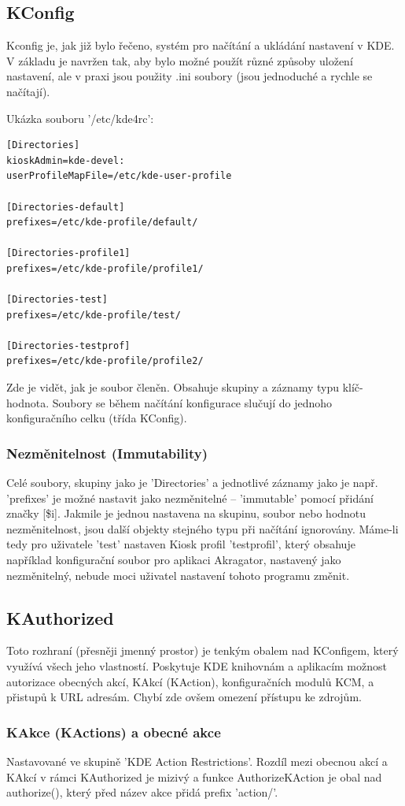 \subsection{KConfig}
Kconfig je, jak již bylo řečeno, systém pro načítání a ukládání nastavení v KDE.
V základu je navržen tak, aby bylo možné použít různé způsoby uložení nastavení,
ale v praxi jsou použity .ini soubory (jsou jednoduché a rychle se načítají).

Ukázka souboru '/etc/kde4rc':
\begin{verbatim}
[Directories]
kioskAdmin=kde-devel:
userProfileMapFile=/etc/kde-user-profile

[Directories-default]
prefixes=/etc/kde-profile/default/

[Directories-profile1]
prefixes=/etc/kde-profile/profile1/

[Directories-test]
prefixes=/etc/kde-profile/test/

[Directories-testprof]
prefixes=/etc/kde-profile/profile2/
\end{verbatim}
Zde je vidět, jak je soubor členěn. Obsahuje skupiny a záznamy typu
klíč-hodnota. Soubory se během načítání konfigurace slučují do jednoho
konfiguračního celku
(třída KConfig).

\subsubsection{Nezměnitelnost (Immutability)}
Celé soubory, skupiny jako je 'Directories' a jednotlivé záznamy jako je např.
'prefixes' je možné nastavit jako nezměnitelné -- 'immutable' pomocí přidání
značky [\$i].
Jakmile je jednou nastavena na skupinu, soubor nebo hodnotu nezměnitelnost, jsou
další objekty stejného typu při načítání ignorovány. Máme-li tedy pro uživatele
'test' nastaven Kiosk profil 'testprofil', který obsahuje například konfigurační
soubor pro aplikaci Akragator, nastavený jako nezměnitelný, nebude moci uživatel
nastavení tohoto programu změnit.

\subsection{KAuthorized}
Toto rozhraní (přesněji jmenný prostor) je tenkým obalem nad KConfigem, který
využívá všech jeho vlastností. Poskytuje KDE knihovnám a aplikacím možnost
autorizace obecných akcí, KAkcí (KAction), konfiguračních modulů KCM, a přistupů
k URL adresám.
Chybí zde ovšem omezení přístupu ke zdrojům.

\subsubsection{KAkce (KActions) a obecné akce}
Nastavované ve skupině 'KDE Action Restrictions'.
Rozdíl mezi obecnou akcí a KAkcí v rámci KAuthorized je mizivý a funkce
AuthorizeKAction je obal nad authorize(), který před název akce přidá prefix
'action/'.


